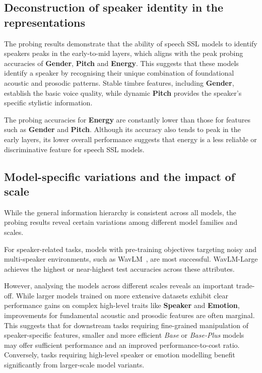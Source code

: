 \documentclass[cameraready]{Interspeech}
\begin{document}
\subsection{Deconstruction of speaker identity in the representations}
\label{sec:deconstruction}

The probing results demonstrate that the ability of speech SSL models to identify speakers peaks in the early-to-mid layers, which aligns with the peak probing accuracies of \textbf{Gender}, \textbf{Pitch} and \textbf{Energy}. This suggests that these models identify a speaker by recognising their unique combination of foundational acoustic and prosodic patterns. Stable timbre features, including \textbf{Gender}, establish the basic voice quality, while dynamic \textbf{Pitch} provides the speaker's specific stylistic information.

The probing accuracies for \textbf{Energy} are constantly lower than those for features such as \textbf{Gender} and \textbf{Pitch}. Although its accuracy also tends to peak in the early layers, its lower overall performance suggests that energy is a less reliable or discriminative feature for speech SSL models.

\subsection{Model-specific variations and the impact of scale}

While the general information hierarchy is consistent across all models, the probing results reveal certain variations among different model families and scales.

For speaker-related tasks, models with pre-training objectives targeting noisy and multi-speaker environments, such as WavLM~\cite{wavlm}, are most successful. WavLM-Large achieves the highest or near-highest test accuracies across these attributes.


However, analysing the models across different scales reveals an important trade-off. While larger models trained on more extensive datasets exhibit clear performance gains on complex high-level traits like \textbf{Speaker} and \textbf{Emotion}, improvements for fundamental acoustic and prosodic features are often marginal. This suggests that for downstream tasks requiring fine-grained manipulation of speaker-specific features, smaller and more efficient \textit{Base} or \textit{Base-Plus} models may offer sufficient performance and an improved performance-to-cost ratio. Conversely, tasks requiring high-level speaker or emotion modelling benefit significantly from larger-scale model variants.
\end{document}

